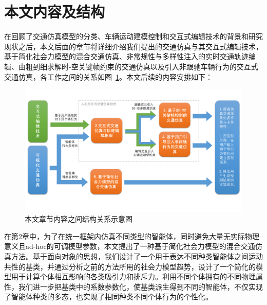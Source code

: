 \section{本文内容及结构}


在回顾了交通仿真模型的分类、车辆运动建模控制和交互式编辑技术的背景和研究现状之后，本文后面的章节将详细介绍我们提出的交通仿真与其交互式编辑技术，基于简化社会力模型的混合交通仿真、非常规性与多样性注入的实时交通轨迹编辑、由粗到细求解时-空关键帧约束的交通仿真以及引入非跟驰车辆行为的交互式交通仿真，各工作之间的关系如图~\ref{fig:intro_overview}。本文后续的内容安排如下：

\begin{figure}[!htb]
\centering
\includegraphics[width=\textwidth]{figure/intro/tot_overview_v3.pdf}
\caption[本文章节内容之间结构关系示意图]{
本文章节内容之间结构关系示意图
}
\label{fig:intro_overview}
\end{figure}

在第2章中，为了在统一框架内仿真不同类型的智能体，同时避免大量无实际物理意义且ad-hoc的可调模型参数，本文提出了一种基于简化社会力模型的混合交通仿真方法。基于面向对象的思想，我们设计了一个用于表达不同种类智能体之间运动共性的基类，并通过分析之前的方法所用的社会力模型趋势，设计了一个简化的模型用于计算个体相互影响的各类吸引力和排斥力。利用不同个体拥有的不同物理属性，我们进一步把基类中的系数参数化，使基类派生得到不同的智能体，不仅实现了智能体种类的多态，也实现了相同种类不同个体行为的个性化。

